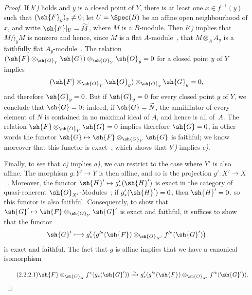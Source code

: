 \begin{proof}
If \emph{b$'$)} holds and $y$ is a closed point of $Y$, there is at least one $x\in f^{-1}(y)$ such that $(\sh{F}_y)_x\neq 0$; let $U=\Spec(B)$ be an affine open neighbourhood of $x$, and write $\sh{F}|_U=\widetilde{M}$, where $M$ is a $B$-module.
Then \emph{b$'$)} implies that $M/\mathfrak{j}_yM$ is nonzero and hence, since $M$ is a flat $A$-module~, that $M\otimes_A A_y$ is a faithfully flat $A_y$-module~.
The relation $(\sh{F}\otimes_{\sh{O}_Y}\sh{G})\otimes_{\sh{O}_Y}\sh{O}_y=0$ for a closed point $y$ of $Y$ implies
\[
  (\sh{F}\otimes_{\sh{O}_Y}\sh{O}_y)\otimes_{\sh{O}_y}\sh{G}_y=0,
\]
and therefore $\sh{G}_y=0$.
But if $\sh{G}_y=0$ for every closed point $y$ of $Y$, we conclude that $\sh{G}=0$: indeed, if $\sh{G}=\widetilde{N}$, the annihilator of every element of $N$ is contained in no maximal ideal of $A$, and hence is all of~$A$.
The relation $\sh{F}\otimes_{\sh{O}_Y}\sh{G}=0$ implies therefore $\sh{G}=0$, in other words the functor $\sh{G}\mapsto\sh{F}\otimes_{\sh{O}_Y}\sh{G}$ is faithful; we know moreover that this functor is exact~, which shows that \emph{b$'$)} implies \emph{c)}.

Finally, to see that \emph{c)} implies \emph{a)}, we can restrict to the case where $Y'$ is also affine.
The morphism $g:Y'\to Y$ is then affine, and so is the projection $g':X'\to X$~.
Moreover, the functor $\sh{H}'\mapsto g'_*(\sh{H}')$ is exact in the category of quasi-coherent $\sh{O}_{X'}$-Modules~; if $g'_*(\sh{H}')=0$, then $\sh{H}'=0$, so this functor is also faithful.
Consequently, to show that $\sh{G}'\mapsto\sh{F}\otimes_{\sh{O}_Y}\sh{G}'$ is exact and faithful, it suffices to show that the functor
\[
  \sh{G}'\longmapsto
  g'_*\bigl(g'^*(\sh{F})\otimes_{\sh{O}_{X'}}f'^*(\sh{G}')\bigr)
\]
is exact and faithful.
The fact that $g$ is affine implies that we have a canonical isomorphism

\begin{equation}
\tag{2.2.2.1}
\label{IV.2.2.2.1}
  \sh{F}\otimes_{\sh{O}_X}f^*(g_*(\sh{G}'))\xrightarrow{\sim} g'_*(g'^*(\sh{F})\otimes_{\sh{O}_{X'}}f'^*(\sh{G}')).
\end{equation}


\end{proof}
